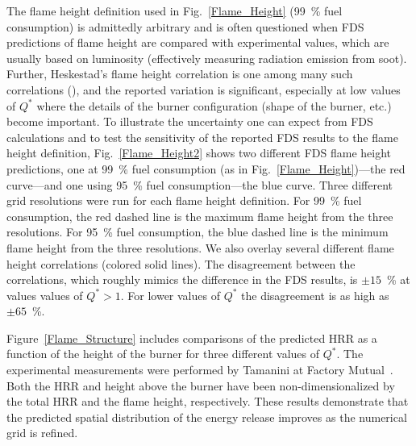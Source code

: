The flame height definition used in Fig.~\ref{Flame_Height} (99~\% fuel consumption) is admittedly arbitrary and is often questioned when FDS predictions of flame height are compared with experimental values, which are usually based on luminosity (effectively measuring radiation emission from soot).  Further, Heskestad's flame height correlation is one among many such correlations (\cite{SFPE:Heskestad,Steward:1970,Becker:1978,Cox:1985,Hasemi:1984,Cetegen:1984,Delichatsios:1984}), and the reported variation is significant, especially at low values of $Q^*$ where the details of the burner configuration (shape of the burner, etc.) become important.  To illustrate the uncertainty one can expect from FDS calculations and to test the sensitivity of the reported FDS results to the flame height definition, Fig.~\ref{Flame_Height2} shows two different FDS flame height predictions, one at 99~\% fuel consumption (as in Fig.~\ref{Flame_Height})---the red curve---and one using 95~\% fuel consumption---the blue curve.  Three different grid resolutions were run for each flame height definition.  For 99~\% fuel consumption, the red dashed line is the maximum flame height from the three resolutions.  For 95~\% fuel consumption, the blue dashed line is the minimum flame height from the three resolutions.  We also overlay several different flame height correlations (colored solid lines).  The disagreement between the correlations, which roughly mimics the difference in the FDS results, is $\pm 15$~\% at values values of $Q^* > 1$.  For lower values of $Q^*$ the disagreement is as high as $\pm 65$~\%.

Figure~\ref{Flame_Structure} includes comparisons of the predicted HRR as a function of the height of the burner for three different values of $Q^*$. The experimental
measurements were performed by Tamanini at Factory Mutual~\cite{Tamanini:CF1983}. Both the HRR and height above the burner have been non-dimensionalized by the total HRR and
the flame height, respectively. These results demonstrate that the predicted spatial distribution of the energy release improves as the numerical grid is refined.

\clearpage


